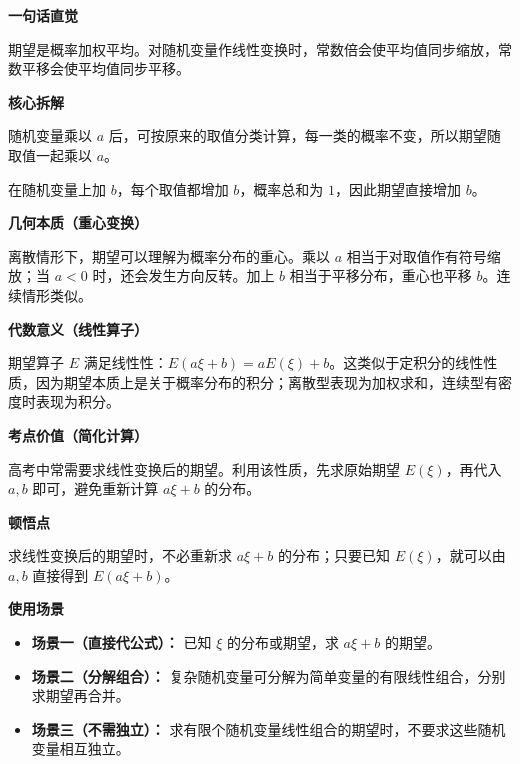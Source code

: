 \begin{explanationbox}
	\textbf{\textcolor{CExplanation}{一句话直觉}}

	期望是概率加权平均。对随机变量作线性变换时，常数倍会使平均值同步缩放，常数平移会使平均值同步平移。

	\medskip
	\textbf{\textcolor{CExplanation}{核心拆解}}
	\begin{description}[style=nextline, leftmargin=2.8em, labelsep=0.5em, itemsep=0.45em]
		\item[\textbf{要点一（常数倍）：}] 随机变量乘以 $a$ 后，可按原来的取值分类计算，每一类的概率不变，所以期望随取值一起乘以 $a$。
		\item[\textbf{要点二（常数加）：}] 在随机变量上加 $b$，每个取值都增加 $b$，概率总和为 $1$，因此期望直接增加 $b$。
	\end{description}

	\medskip
	\textbf{\textcolor{CExplanation}{几何本质（重心变换）}}

	离散情形下，期望可以理解为概率分布的重心。乘以 $a$ 相当于对取值作有符号缩放；当 $a<0$ 时，还会发生方向反转。加上 $b$ 相当于平移分布，重心也平移 $b$。连续情形类似。

	\medskip
	\textbf{\textcolor{CExplanation}{代数意义（线性算子）}}

	期望算子 $E$ 满足线性性：$E(a\xi+b)=aE(\xi)+b$。这类似于定积分的线性性质，因为期望本质上是关于概率分布的积分；离散型表现为加权求和，连续型有密度时表现为积分。

	\medskip
	\textbf{\textcolor{CExplanation}{考点价值（简化计算）}}

	高考中常需要求线性变换后的期望。利用该性质，先求原始期望 $E(\xi)$，再代入 $a,b$ 即可，避免重新计算 $a\xi+b$ 的分布。

	\medskip
	\textbf{\textcolor{CExplanation}{顿悟点}}

	求线性变换后的期望时，不必重新求 $a\xi+b$ 的分布；只要已知 $E(\xi)$，就可以由 $a,b$ 直接得到 $E(a\xi+b)$。

	\medskip
	\textbf{\textcolor{CExplanation}{使用场景}}
	\begin{itemize}[leftmargin=*, itemsep=0.5em, topsep=0.4em]
		\item \textbf{场景一（直接代公式）：} 已知 $\xi$ 的分布或期望，求 $a\xi+b$ 的期望。
		\item \textbf{场景二（分解组合）：} 复杂随机变量可分解为简单变量的有限线性组合，分别求期望再合并。
		\item \textbf{场景三（不需独立）：} 求有限个随机变量线性组合的期望时，不要求这些随机变量相互独立。
	\end{itemize}
\end{explanationbox}